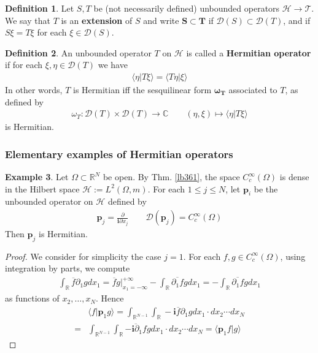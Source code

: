 \documentclass[12pt,b5paper,notitlepage]{article}
\theoremstyle{definition}
\newtheorem{df}{Definition}[subsection]
\newtheorem{eg}[df]{Example}
\theoremstyle{plain}
\newcommand{\ovl}{\overline}
\newcommand{\Dom}{\mathscr{D}}
\newcommand{\bk}[1]{\langle {#1}\rangle}
\newcommand{\im}{\mathbf{i}}
\newcommand{\Cbb}{\mathbb C}
\newcommand{\Rbb}{\mathbb R}
\newcommand{\MH}{\mathcal H}
\newcommand{\MT}{\mathcal T}
\newcommand{\pbf}{\mathbf p}
\numberwithin{equation}{section}
\begin{document}
\begin{df}
Let $S,T$ be (not necessarily defined) unbounded operators $\MH\rightarrow\MT$. We say that $T$ is an \textbf{extension}  of $S$ and write $\pmb{S\subset T}$ if $\Dom(S)\subset \Dom(T)$, and if $S\xi=T\xi$ for each $\xi\in\Dom(S)$.
\end{df}


\begin{df}
An unbounded operator $T$ on $\MH$ is called a \textbf{Hermitian operator}  if for each $\xi,\eta\in\Dom(T)$ we have
\begin{align*}
\bk{\eta|T\xi}=\bk{T\eta|\xi}
\end{align*} 
In other words, $T$ is Hermitian iff the sesquilinear form $\pmb{\omega_T}$ associated to $T$,   as defined by
\begin{align*}
\omega_T:\Dom(T)\times\Dom(T)\rightarrow\Cbb\qquad (\eta,\xi)\mapsto\bk{\eta|T\xi}
\end{align*}
is Hermitian.
\end{df}


\subsubsection{Elementary examples of Hermitian operators}


\begin{eg}\label{lb362}
Let $\Omega\subset\Rbb^N$ be open. By Thm. \ref{lb361}, the space $C_c^\infty(\Omega)$ is dense in the Hilbert space $\MH:=L^2(\Omega,m)$. For each $1\leq j\leq N$, let $\pbf_i$ be the unbounded operator on $\MH$ defined by
\begin{align*}
\pbf_j=\frac{\partial}{\im\partial x_j}\qquad\Dom(\pbf_j)=C_c^\infty(\Omega)
\end{align*}
Then $\pbf_j$ is Hermitian.
\end{eg}



\begin{proof}
We consider for simplicity the case $j=1$. For each $f,g\in C_c^\infty(\Omega)$, using integration by parts, we compute
\begin{align*}
\int_\Rbb \ovl f\partial_1gdx_1=\ovl fg\big|_{x_1=-\infty}^{+\infty}-\int_\Rbb \ovl{\partial_1f}gdx_1=-\int_\Rbb \ovl{\partial_1f}gdx_1
\end{align*}
as functions of $x_2,\dots,x_N$. Hence
\begin{align*}
&\bk{f|\pbf_1g}=\int_{\Rbb^{N-1}}\int_\Rbb -\im \ovl f\partial_1g dx_1\cdot dx_2\cdots dx_N\\
=&\int_{\Rbb^{N-1}}\int_\Rbb \ovl{-\im\partial_1f}g dx_1\cdot dx_2\cdots dx_N=\bk{\pbf_1f|g}
\end{align*}
\end{proof}
\end{document}
